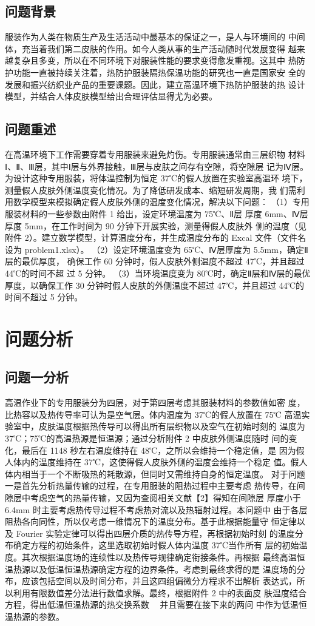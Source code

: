\documentclass{article}
\begin{document}
	\subsection{问题背景}
	服装作为人类在物质生产及生活活动中最基本的保证之一，是人与环境间的
	中间体，充当着我们第二皮肤的作用。如今人类从事的生产活动随时代发展变得
	越来越复杂且多变，所以在不同环境下对服装性能的要求变得愈发重视。这其中
	热防护功能一直被持续关注着，热防护服装隔热保温功能的研究也一直是国家安
	全的发展和振兴纺织业产品的重要课题。因此，建立高温环境下热防护服装的热
	设计模型，并结合人体皮肤模型给出合理评估显得尤为必要。
	
	
	\subsection{问题重述}
	在高温环境下工作需要穿着专用服装来避免灼伤。专用服装通常由三层织物
	材料Ⅰ、Ⅱ、Ⅲ层，其中Ⅰ层与外界接触，Ⅲ层与皮肤之间存有空隙，将空隙层
	记为Ⅳ层。
	为设计这种专用服装，将体温控制为恒定 37℃的假人放置在实验室高温环
	境下，测量假人皮肤外侧温度变化情况。为了降低研发成本、缩短研发周期，我
	们需利用数学模型来模拟确定假人皮肤外侧的温度变化情况，解决以下问题：
	（1）专用服装材料的一些参数由附件 1 给出，设定环境温度为 75℃、Ⅱ层
	厚度 6mm、Ⅳ层厚度 5mm，在工作时间为 90 分钟下开展实验，测量得假人皮肤外
	侧的温度（见附件 2）。建立数学模型，计算温度分布，并生成温度分布的 Excal
	文件（文件名设为 problem1.xlsx）。
	（2）设定环境温度变为 65℃、Ⅳ层厚度为 5.5mm，确定Ⅱ层的最优厚度，
	确保工作 60 分钟时，假人皮肤外侧温度不超过 47℃，并且超过 44℃的时间不超
	过 5 分钟。
	（3）当环境温度变为 80℃时，确定Ⅱ层和Ⅳ层的最优厚度，以确保工作 30
	分钟时假人皮肤的外侧温度不超过 47℃，并且超过 44℃的时间不超过 5 分钟。
	\section{问题分析}
	\subsection{问题一分析}
	高温作业下的专用服装分为四层，对于第四层考虑其服装材料的参数值如密
	度，比热容以及热传导率可认为是空气层。体内温度为 37℃的假人放置在 75℃
	高温实验室中，皮肤温度根据热传导可以得出所有层织物以及空气在初始时刻的
	温度为 37℃；75℃的高温热源是恒温源；通过分析附件 2 中皮肤外侧温度随时
	间的变化，最后在 1148 秒左右温度维持在 48℃，之所以会维持一个稳定值，是
	因为假人体内的温度维持在 37℃，这使得假人皮肤外侧的温度会维持一个稳定
	值。假人体内相当于一个不断吸热的耗散源，但同时又需维持自身的恒定温度。
	对于问题一是首先分析热量传输的过程，在专用服装的阻热过程中主要考虑
	热传导，在间隙层中考虑空气的热量传输，又因为查阅相关文献【2】得知在间隙层
	厚度小于 6.4mm 时主要考虑热传导过程不考虑热对流以及热辐射过程。本问题中
	由于各层阻热各向同性，所以仅考虑一维情况下的温度分布。基于此根据能量守
	恒定律以及 Fourier 实验定律可以得出四层介质的热传导方程，再根据初始时刻
	的温度分布确定方程的初始条件，这里选取初始时假人体内温度 37℃当作所有
	层的初始温度。其次根据温度场的连续性以及热传导规律确定衔接条件。再根据
	最终高温恒温热源以及低温恒温热源确定方程的边界条件。考虑到最终求得的是
	温度场的分布，应该包括空间以及时间分布，并且这四组偏微分方程求不出解析
	表达式，所以利用有限数值差分法进行数值求解。最终，根据附件 2 中的表面皮
	肤温度结合方程，得出低温恒温热源的热交换系数  ，并且需要在接下来的两问
	中作为低温恒温热源的参数。
\end{document}
